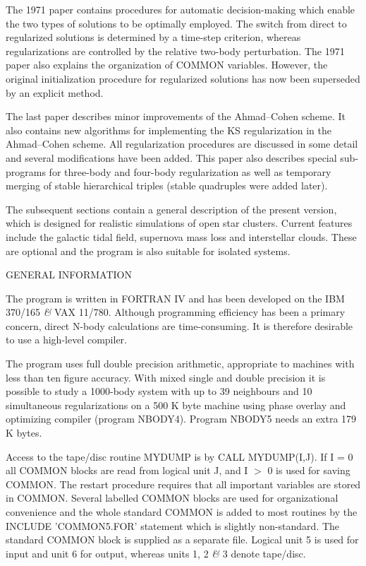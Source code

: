    The 1971 paper contains procedures for automatic decision-making
    which enable the two types of solutions to be optimally employed.  The
        switch from direct to regularized solutions is determined by a
  time-step criterion, whereas regularizations are controlled by the relative
   two-body perturbation.  The 1971 paper also explains the organization of
    COMMON variables.  However, the original initialization procedure 
    for regularized solutions has now been superseded by an explicit method.

   The last paper describes minor improvements of the Ahmad--Cohen scheme.  It
 also contains new algorithms for implementing the KS regularization in
 the Ahmad--Cohen scheme.  All regularization procedures are discussed in
 some detail and several modifications have been added.
This paper also describes special sub-programs for three-body and
four-body regularization as well as temporary merging of stable
hierarchical triples (stable quadruples were added later).

  The subsequent sections contain a general description of the present version,
 which is designed for realistic simulations of open star clusters.  Current
 features include the galactic tidal field, supernova mass loss and interstellar
 clouds.  These are optional and the program is also suitable for isolated
 systems.
\bigskip
\bigskip
\centerline{                            GENERAL INFORMATION}
\bigskip

   The program is written in FORTRAN IV and has been developed on the IBM
 370/165 {\it\&} VAX 11/780.  Although programming efficiency has been a
 primary concern, direct N-body calculations are time-consuming.  It is
 therefore desirable to use a high-level compiler.

        The program uses full double precision arithmetic,
    appropriate to machines with less than ten figure accuracy.  With 
 mixed single and double precision it
 is possible to study a 1000-body system with up to 39 neighbours and 10
    simultaneous regularizations on a 500 K byte machine using phase overlay and
    optimizing compiler (program NBODY4).  Program NBODY5 needs an 
    extra 179 K bytes.

   Access to the tape/disc routine MYDUMP is by CALL MYDUMP(I,J).  If I = 0 all
 COMMON blocks are read from logical unit J, and I $>$ 0 is used for saving
 COMMON.  The restart procedure requires that all important variables are stored
 in COMMON.  Several labelled COMMON blocks are used for organizational
 convenience and the whole standard COMMON is added to most routines
 by the INCLUDE 'COMMON5.FOR' statement which is slightly non-standard.
 The standard COMMON block is supplied as a separate file.
 Logical unit 5 is used for input and unit 6 for output,
              whereas units 1, 2 {\it\&} 3 denote tape/disc.   

